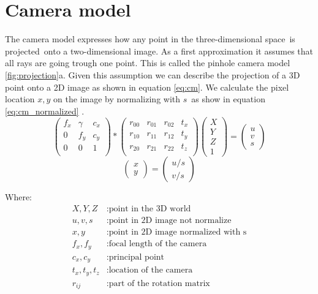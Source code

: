 \documentclass[11pt,a4paper,titlepage,oneside]{report}
\begin{document}
\section{Camera model}
The camera model expresses how any point in the three-dimensional space is projected onto a two-dimensional image. As a first approximation it assumes that all rays are going trough one point. This is called the pinhole camera model \ref{fig:projection}a. Given this assumption we can describe the projection of a 3D point onto a 2D image as shown in equation \ref{eq:cm}. We calculate the pixel location $x,y$ on the image by normalizing with $s$ as show in equation \ref{eq:cm_normalized} \cite{rvc}.
\begin{equation}\label{eq:cm}
  \begin{pmatrix}
		f_x & \gamma & c_x \\
		0 & f_y & c_y \\
		0 & 0 & 1 \\
	\end{pmatrix}*
	\begin{pmatrix}
		r_{00} & r_{01} & r_{02} & t_x \\
		r_{10} & r_{11} & r_{12} & t_y \\
		r_{20} & r_{21} & r_{22} & t_z \\
	\end{pmatrix}
	\begin{pmatrix}
		X \\
		Y \\
		Z \\
		1
	\end{pmatrix}=
	\begin{pmatrix}
		u \\
		v \\
		s
  \end{pmatrix}
\end{equation}
\begin{equation}\label{eq:cm_normalized}
	\begin{pmatrix}
		x \\
		y
	\end{pmatrix}=
	\begin{pmatrix}
		u/s \\
		v/s 
  \end{pmatrix}
\end{equation}

Where:
\begin{align*}
  X,Y,Z			&: \text{point in the 3D world}\\
	u,v,s	   	&: \text{point in 2D image not normalize}\\
	x,y				&: \text{point in 2D image normalized with s}\\
	f_x,f_y  	&: \text{focal length of the camera}\\
  c_x,c_y  	&: \text{principal point}\\
  t_x,t_y,t_z	&: \text{location of the camera}\\
  r_{ij}	&: \text{part of the rotation matrix}
\end{align*}
\end{document}
